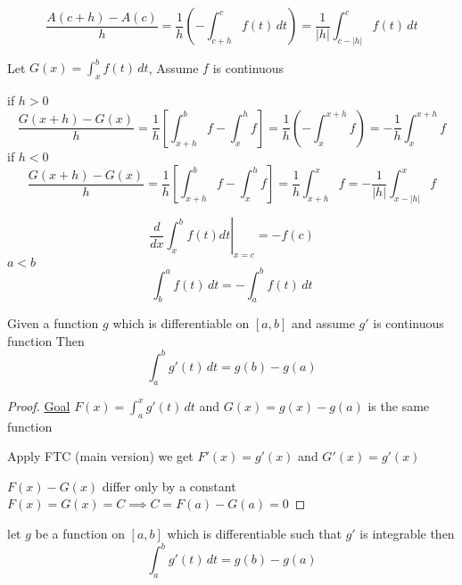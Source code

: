 \[ \frac{A(c+h) - A(c)}{h} = \frac{1}{h} \left(-\int_{c+h}^c f(t)\,dt\right) = \frac{1}{|h|}\int_{c-|h|}^{c}f(t)\,dt\]

Let $\displaystyle G(x) = \int_x^b f(t)\,dt$, Assume $f$ is continuous

if $h > 0$
\[\frac{G(x+h) - G(x)}{h} = \frac{1}{h}\left[\int_{x+h}^b f - \int_x^h f\right] = \frac{1}{h}\left(-\int_x^{x+h}f\right) = -\frac{1}{h}\int_x^{x+h}f\]
if $h < 0$
\[\frac{G(x+h) - G(x)}{h} = \frac{1}{h}\left[\int_{x+h}^b f - \int_x^h f\right] = \frac{1}{h}\int_{x+h}^{x}f = -\frac{1}{|h|}\int^x_{x-|h|}f\]

\[\left.\frac{d}{dx}\int_x^b f(t)dt\right|_{x=c} = -f(c)\]
$a < b$
\[\int_b^a f(t)\,dt = -\int_a^b f(t)\,dt\]

\begin{theorem*}
  Given a function $g$ which is differentiable on $[a, b]$ and assume $g'$ is continuous function
  Then 
  \[\int_a^b g'(t)\,dt = g(b) - g(a)\]
\end{theorem*}

\begin{proof}
  \underline{Goal} $\displaystyle F(x) = \int_a^x g'(t)\,dt$ and $G(x) = g(x) - g(a)$ is the same function

  Apply FTC (main version) we get $F'(x) = g'(x)$ and $G'(x) = g'(x)$

  $F(x) - G(x)$ differ only by a constant $F(x) = G(x) = C \implies C = F(a) - G(a) = 0$
\end{proof}

\begin{theorem*}
  let $g$ be a function on $[a, b]$ which is differentiable such that $g'$ is integrable then 
  \[\int_a^b g'(t)\,dt = g(b) - g(a)\]
\end{theorem*}


